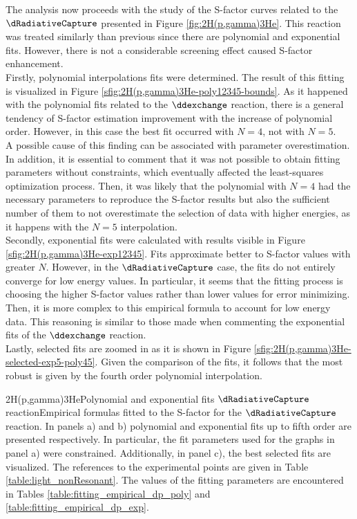 \documentclass[openany]{book}
\begin{document}
The analysis now proceeds with the study of the S-factor curves related to the $\dRadiativeCapture$ presented in Figure \ref{fig:2H(p,gamma)3He}. This reaction was treated similarly than previous since there are polynomial and exponential fits. However, there is not a considerable screening effect caused S-factor enhancement. \\

Firstly, polynomial interpolations fits were determined. The result of this fitting is visualized in Figure \ref{sfig:2H(p,gamma)3He-poly12345-bounds}. As it happened with the polynomial fits related to the $\ddexchange$ reaction, there is a general tendency of S-factor estimation improvement with the increase of polynomial order. However, in this case the best fit occurred with $N = 4$, not with $N = 5$. \\

A possible cause of this finding can be associated with parameter overestimation. In addition, it is essential to comment that it was not possible to obtain fitting parameters without constraints, which eventually affected the least-squares optimization process. Then, it was likely that the polynomial with $N = 4$ had the necessary parameters to reproduce the S-factor results but also the sufficient number of them to not overestimate the selection of data with higher energies, as it happens with the $N = 5$ interpolation. \\

Secondly, exponential fits were calculated with results visible in Figure \ref{sfig:2H(p,gamma)3He-exp12345}. Fits approximate better to S-factor values with greater $N$. However,  in the $\dRadiativeCapture$ case, the fits do not entirely converge for low energy values. In particular, it seems that the fitting process is choosing the higher S-factor values rather than lower values for error minimizing. Then, it is more complex to this empirical formula to account for low energy data. This reasoning is similar to those made when commenting the exponential fits of the $\ddexchange$ reaction. \\

Lastly, selected fits are zoomed in as it is shown in Figure \ref{sfig:2H(p,gamma)3He-selected-exp5-poly45}. Given the comparison of the fits, it follows that the most robust is given by the fourth order polynomial interpolation.


{2H(p,gamma)3He}{Polynomial and exponential fits $\dRadiativeCapture$ reaction}{Empirical formulas fitted to the S-factor for the $\dRadiativeCapture$ reaction. In panels a) and b) polynomial and exponential fits up to fifth order are presented respectively.  In particular, the fit parameters used for the graphs in panel a) were constrained. Additionally, in panel c), the best selected fits are visualized. The references to the experimental points are given in Table \ref{table:light_nonResonant}. The values of the fitting parameters are encountered in Tables \ref{table:fitting_empirical_dp_poly} and \ref{table:fitting_empirical_dp_exp}.}
\end{document}

